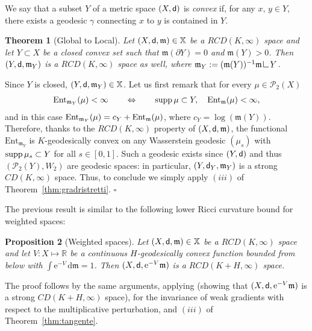 \documentclass[reqno,11pt]{article}
\numberwithin{equation}{section}
\newcommand{\R}{\mathbb{R}}
\newcommand{\mm}{{\mbox{\boldmath$m$}}}
\newcommand{\sfd}{{\sf d}}
\newcommand{\rme}{{\mathrm e}}
\newcommand{\supp}{\mathop{\rm supp}\nolimits}   %
\renewcommand{\d}{{\mathrm d}}
\newcommand{\ProbabilitiesTwo}[1]{\mathscr P_2(#1)}     %
\newenvironment{proof}{\removelastskip\par\medskip   %
\noindent{\em Proof.}
\rm}{\penalty-20\null\hfill$\square$\par\medbreak}
\newtheorem{theorem}{Theorem}[section]
\newtheorem{proposition}[theorem]{Proposition}
\newcommand{\ent}[1]{{\rm Ent}_{\mm}(#1)}              %
\newcommand{\probt}{\ProbabilitiesTwo}
\newcommand{\X}{\mathbb X}
\newcommand{\res}{\mathop{\hbox{\vrule height 7pt width .5pt depth 0pt
\vrule height .5pt width 6pt depth 0pt}}\nolimits} %
\newcommand{\entr}[2]{{\rm Ent}_{#2}(#1)}              %
\newcommand{\rcd}[2]{RCD(#1,#2)}
\renewcommand{\mm}{\mathfrak m}
\begin{document}
We say that a subset $Y$ of a metric space $(X,\sfd)$ is
\emph{convex} if, for any $x,\,y\in Y$, there exists a geodesic
$\gamma$ connecting $x$ to $y$ is contained in $Y$.

\begin{theorem}[Global to Local]
Let $(X,\sfd,\mm)\in\X$ be a $\rcd K\infty$ space and let $Y\subset
X$ be a closed convex set such that $\mm(\partial Y)=0$ and
$\mm(Y)>0$. Then $(Y,\sfd,\mm_Y)$ is a $\rcd K\infty$ space as well,
where $\mm_Y:=(\mm(Y))^{-1}\mm\res Y$.
\end{theorem}
\begin{proof} Since $Y$ is closed, $(Y,\sfd,\mm_Y)\in\X$. Let us first remark
that for every $\mu\in \probt X$
\begin{equation}
  \label{eq:32}
  \begin{gathered}
    \entr\mu{\mm_Y}<\infty\qquad\Leftrightarrow\qquad \supp\mu\subset
    Y,\quad  \ent\mu<\infty,
 \end{gathered}
\end{equation}
and in this case $\entr\mu{\mm_Y}=c_Y +\ent\mu$, where
$c_Y=\log(\mm(Y))$. Therefore, thanks to the $RCD(K,\infty)$
property of $(X,\sfd,\mm)$, the functional $\mathrm{Ent}_{\mm_Y}$ is
$K$-geodesically convex on any Wasserstein geodesic $(\mu_s)$ with
$\supp\mu_s\subset Y$ for all $s\in [0,1]$. Such a geodesic exists
since $(Y,\sfd)$ and thus $(\probt Y,W_2)$ are geodesic spaces: in
particular, $(Y,\sfd_Y,\mm_Y)$ is a strong $CD(K,\infty)$ space.
Thus, to conclude we simply apply $(iii)$ of
Theorem~\ref{thm:gradristretti}.
\end{proof}

The previous result is similar to the following lower Ricci
curvature bound for weighted spaces:

\begin{proposition}[Weighted spaces]
  \label{prop:weighted}
  Let $(X,\sfd,\mm)\in\X$ be a $RCD(K,\infty)$ space and let
  $V:X\mapsto \R$ be a continuous $H$-geodesically convex function
  bounded from below with $\int \rme^{-V}\,\d\mm=1$. Then
  $(X,\sfd,\rme^{-V}\mm)$ is a $RCD(K+H,\infty)$ space.
\end{proposition}
The proof follows by the same arguments, applying
\cite[Proposition~4.14]{Sturm06I} (showing that
$(X,\sfd,\rme^{-V}\mm)$ is a strong $CD(K+H,\infty)$ space),
\cite[Lemma~4.11]{Ambrosio-Gigli-Savare11} for the invariance of
weak gradients with respect to the multiplicative perturbation, and
$(iii)$ of Theorem~\ref{thm:tangente}.
\end{document}
